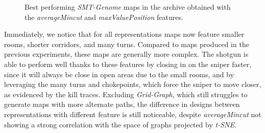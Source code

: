 \begin{figure}[p]
{    }
    \qquad
    \caption{Best performing \textit{SMT-Genome} maps in the archive obtained with the \textit{averageMincut} and \textit{maxValuePosition} features.}
    \label{fig:best_maps_smt_exp3}
\end{figure}

Immediately, we notice that for all representations maps now feature smaller rooms, shorter corridors, and many turns. Compared to maps produced in the previous experiments, these maps are generally more complex. The shotgun is able to perform well thanks to these features by closing in on the sniper faster, since it will always be close in open areas due to the small rooms, and by leveraging the many turns and chokepoints, which force the sniper to move closer, as evidenced by the kill traces. Excluding \textit{Grid-Graph}, which still struggles to generate maps with more alternate paths, the difference in designs between representations with different feature is still noticeable, despite \textit{averageMincut} not showing a strong correlation with the space of graphs projected by \textit{t-SNE}.

